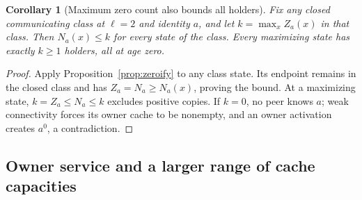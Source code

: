 \documentclass[11pt]{article}
\newtheorem{corollary}[theorem]{Corollary}
\begin{document}
\begin{corollary}[Maximum zero count also bounds all holders]
\label{cor:maxholders}
Fix any closed communicating class at $\ell=2$ and
identity $a$, and let $k=\max_x Z_a(x)$ in that class.
Then $N_a(x)\le k$ for every state of the class.
Every maximizing state has exactly $k\ge1$ holders,
all at age zero.
\end{corollary}
\begin{proof}
Apply Proposition~\ref{prop:zeroify} to any class state.
Its endpoint remains in the closed class and has
$Z_a=N_a\ge N_a(x)$, proving the bound.
At a maximizing state, $k=Z_a\le N_a\le k$ excludes
positive copies. If $k=0$, no peer knows $a$; weak
connectivity forces its owner cache to be nonempty,
and an owner activation creates $a^0$, a contradiction.
\end{proof}

\subsection{Owner service and a larger range of cache capacities}
\end{document}
